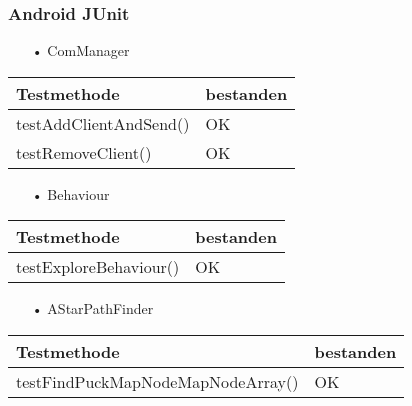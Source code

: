 \documentclass[xcolor=dvipsnames]{beamer}
\begin{document}
	\begin{frame}
	\frametitle{Android JUnit}
		\begin{itemize}
			\item[•]ComManager
		\end{itemize}		
	    \begin{tabular}{l|p{2cm}}
				\hline
					\textbf{Testmethode} & \textbf{bestanden}\\
				\hline \hline
					 testAddClientAndSend() & OK \\
 				\hline
					testRemoveClient() & OK \\
				\hline		
			\end{tabular}
			\vspace{0.5cm}
		\begin{itemize}
				\item[•]Behaviour
		\end{itemize}	
		 	\begin{tabular}{l|p{2cm}}
				\hline
					\textbf{Testmethode} & \textbf{bestanden}\\
				\hline \hline
					 testExploreBehaviour() & OK \\
 				\hline		
			\end{tabular}
			\vspace{0.5cm}
		\begin{itemize}
				\item[•]AStarPathFinder
		\end{itemize}	
		 	\begin{tabular}{l|p{2cm}}
				\hline
					\textbf{Testmethode} & \textbf{bestanden}\\
				\hline \hline
					 testFindPuckMapNodeMapNodeArray() & OK \\
 				\hline		
			\end{tabular}	
	\end{frame}
	
\end{document}

